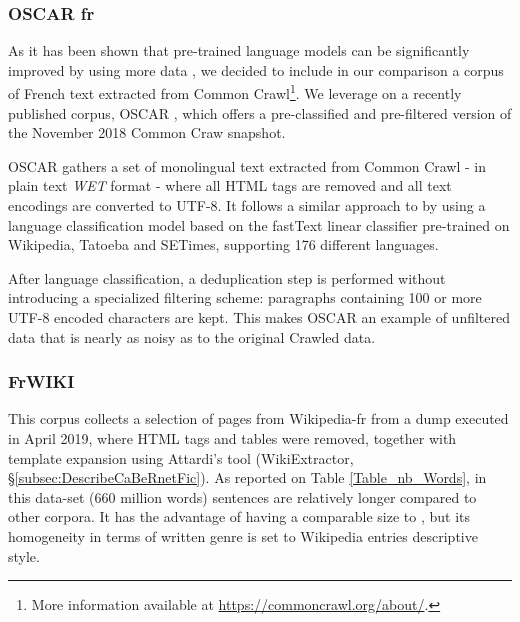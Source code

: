 \subsubsection{OSCAR fr}
As it has been shown that pre-trained language models can be significantly improved by using more data \citep{liu-etal-2019-roberta,raffel-etal-2020-exploring}, we decided to include in our comparison a corpus of French text extracted from Common Crawl\footnote{More information available  at \url{https://commoncrawl.org/about/}.}. We leverage on a recently published corpus, OSCAR \citep{ortiz-suarez-etal-2019-asynchronous}, which offers a pre-classified and pre-filtered version of the November 2018 Common Craw snapshot.

OSCAR gathers a set of monolingual text extracted from Common Crawl - in plain text \emph{WET} format - where all HTML tags are removed and all text encodings are converted to UTF-8. It follows a similar approach to \citep{grave-etal-2018-learning} by using a language classification model based on the fastText linear classifier \citep{joulin-etal-2016-fasttext,joulin-etal-2017-bag} pre-trained on Wikipedia, Tatoeba and SETimes, supporting 176 different languages.

After language classification, a deduplication step is performed without introducing a specialized filtering scheme: paragraphs containing 100 or more UTF-8 encoded characters are kept. This makes OSCAR an example of unfiltered data that is nearly as noisy as to the original Crawled data.%


\subsubsection{FrWIKI}
This corpus collects a selection of pages from Wikipedia-fr from a dump executed in April 2019, where HTML tags and tables were removed, together with template expansion using Attardi's tool (WikiExtractor, §\ref{subsec:DescribeCaBeRnetFic}). As reported on Table \ref{Table_nb_Words}, in this data-set (660 million words) sentences are relatively longer compared to other corpora. It has the advantage of having a comparable size to \Cabernet, but its homogeneity in terms of written genre is set to Wikipedia entries descriptive style.


